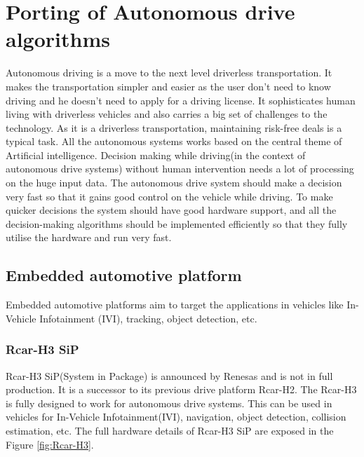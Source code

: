 %
\chapter{Porting of Autonomous drive algorithms}
Autonomous driving is a move to the next level driverless transportation. It makes the transportation simpler and easier as the user don’t need to know driving and he doesn't need to apply for a driving license. It sophisticates human living with driverless vehicles and also carries a big set of challenges to the technology. As it is a driverless transportation, maintaining risk-free deals is a typical task. All the autonomous systems works based on the central theme of Artificial intelligence. Decision making while driving(in the context of autonomous drive systems) without human intervention needs a lot of processing on the huge input data. The autonomous drive system should make a decision very fast so that it gains good control on the vehicle while driving. To make quicker decisions the system should have good hardware support, and all the decision-making algorithms should be implemented efficiently so that they fully utilise the hardware and run very fast.
\section{Embedded automotive platform}
Embedded automotive platforms aim to target the applications in vehicles like In-Vehicle Infotainment (IVI), tracking, object detection, etc. 
\subsection{Rcar-H3 SiP}
Rcar-H3 SiP(System in Package) is announced by Renesas and is not in full production. It is a successor to its previous drive platform Rcar-H2. The Rcar-H3 is fully designed to work for autonomous drive systems. This can be used in vehicles for In-Vehicle Infotainment(IVI), navigation, object detection, collision estimation, etc. The full hardware details of Rcar-H3 SiP are exposed in the Figure \ref{fig:Rcar-H3}.
